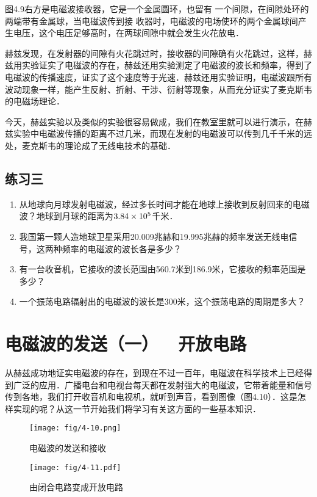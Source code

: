 图4.9右方是电磁波接收器，它是一个金属圆环，也留有
一个间隙，在间隙处环的两端带有金属球，当电磁波传到接
收器时，电磁波的电场使环的两个金属球间产生电压，这个电压足够高时，在两球间隙中就会发生火花放电．

赫兹发现，在发射器的间隙有火花跳过时，接收器的间隙确有火花跳过，这样，赫兹用实验证实了电磁波的存在，赫兹还用实验测定了电磁波的波长和频率，得到了电磁波的传播速度，证实了这个速度等于光速．赫兹还用实验证明，电磁波跟所有波动现象一样，能产生反射、折射、干涉、衍射等现象，从而充分证实了麦克斯韦的电磁场理论．

今天，赫兹实验以及类似的实验很容易做成，我们在教室里就可以进行演示，在赫兹实验中电磁波传播的距离不过几米，而现在发射的电磁波可以传到几千千米的远处，麦克斯韦的理论成了无线电技术的基础．

\subsection*{练习三}
\begin{enumerate}
	\item 从地球向月球发射电磁波，经过多长时间才能在地球上接收到反射回来的电磁波？地球到月球的距离为$3.84\times10^5$千米．
	\item 我国第一颗人造地球卫星采用20.009兆赫和19.995兆赫的频率发送无线电信号，这两种频率的电磁波的波长各是多少？
	\item 有一台收音机，它接收的波长范围由560.7米到186.9米，它接收的频率范围是多少？
	\item 一个振荡电路辐射出的电磁波的波长是300米，这个振荡电路的周期是多大？
\end{enumerate}

\section{电磁波的发送（一）~~开放电路}
从赫兹成功地证实电磁波的存在，到现在不过一百年，电磁波在科学技术上已经得到广泛的应用．广播电台和电视台每天都在发射强大的电磁波，它带着能量和信号传到各地，我们打开收音机和电视机，就听到声音，看到图像（图4.10）．这是怎样实现的呢？从这一节开始我们将学习有关这方面的一些基本知识．
\begin{figure}[htp]\centering
\texttt{[image: fig/4-10.png]}
\caption{电磁波的发送和接收}
\end{figure}

\begin{figure}[htp]\centering
	\texttt{[image: fig/4-11.pdf]}
	\caption{由闭合电路变成开放电路}
	\end{figure}

